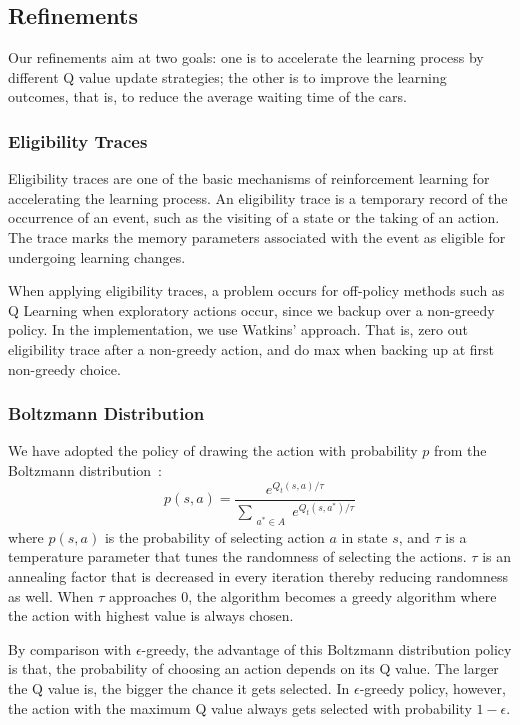 \subsection{Refinements}
Our refinements aim at two goals: one is to accelerate the learning process by different Q value update strategies; the other is to improve the learning outcomes, that is, to reduce the average waiting time of the cars.

\subsubsection{Eligibility Traces}
Eligibility traces are one of the basic mechanisms of reinforcement learning for accelerating the learning process. An eligibility trace is a temporary record of the occurrence of an event, such as the visiting of a state or the taking of an action. The trace marks the memory parameters associated with the event as eligible for undergoing learning changes. 

When applying eligibility traces, a problem occurs for off-policy methods such as Q Learning when exploratory actions occur, since we backup over a non-greedy policy. In the implementation, we use Watkins' approach. That is, zero out eligibility trace after a non-greedy action, and do max
when backing up at first non-greedy choice.

\subsubsection{Boltzmann Distribution}
We have adopted the policy of drawing the action with probability $p$ from the Boltzmann distribution~\cite{watkins_qlearning_1992}:
\begin{equation}
\label{equ:rewardprob}
p(s, a) = \dfrac {e^{Q_t(s, a) / \tau}} {\sum_{\substack{a^* \in A}} e^{Q_t(s, a^*) / \tau}}
\end{equation}
where $p(s, a)$ is the probability of selecting action $a$ in state $s$, and $\tau$ is a temperature parameter that tunes the randomness of selecting the actions. $\tau$ is an annealing factor that is decreased in every iteration thereby reducing randomness as well. When $\tau$ approaches 0, the algorithm becomes a greedy algorithm where the action with highest value is always chosen.

By comparison with $\epsilon $-greedy, the advantage of this Boltzmann distribution policy is that, the probability of choosing an action depends on its Q value. The larger the Q value is, the bigger the chance it gets selected. In $\epsilon $-greedy policy, however, the action with the maximum Q value always gets selected with probability $1-\epsilon$.

